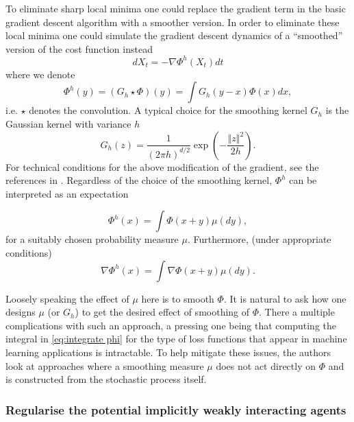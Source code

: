 \documentclass{article}
\theoremstyle{mystyle}
\begin{document}
To eliminate sharp local minima one could replace the gradient term
in the basic gradient descent algorithm with a smoother version. In order to
eliminate these local minima one could simulate the gradient descent
dynamics of a ``smoothed'' version of the cost function instead
\begin{equation}
dX_{t}=-\nabla\Phi^{h}(X_{t})dt\label{eq:ode_h}
\end{equation}
where we denote 
\begin{equation}
\Phi^{h}\left(y\right)=(G_{h}\star\Phi)(y)=\int G_{h}(y-x)\Phi(x)dx,\label{eq:integrate phi}
\end{equation}
i.e. $\star$ denotes the convolution. A typical choice for the smoothing
kernel $G_{h}$ is the Gaussian kernel with variance $h$ 
\[
G_{h}(z)=\frac{1}{\left(2\pi h\right)^{d/2}}\exp\left(-\frac{\left\Vert z\right\Vert ^{2}}{2h}\right).
\]
For technical conditions for the above modification of the gradient, see the references in \cite{kantas2019sharpflatshallowweakly}. Regardless
of the choice of the smoothing kernel, $\Phi^{h}$ can be interpreted
as an expectation 

\[
\Phi^{h}\left(x\right)=\int\Phi(x+y)\mu(dy),
\]
for a suitably chosen probability measure $\mu$. Furthermore, (under
appropriate conditions) 
\begin{equation}
\nabla\Phi^{h}\left(x\right)=\int\nabla\Phi(x+y)\mu(dy).\label{eq:smooth_grad}
\end{equation}

Loosely speaking the effect of $\mu$ here is to smooth $\Phi$.
It is natural to ask how one designs $\mu$ (or $G_{h}$)
to get the desired effect of smoothing of $\Phi$. There a multiple complications with such an approach, a pressing one being that computing the integral in \ref{eq:integrate phi}
for the type of loss functions that appear in machine learning applications
is intractable. To help mitigate these issues, the authors look at approaches where a smoothing measure $\mu$ does not act directly on $\Phi$ and is constructed from the stochastic process itself.


\subsubsection{Regularise the potential implicitly weakly interacting agents}\label{sec: weakly interacting agents}
\end{document}

